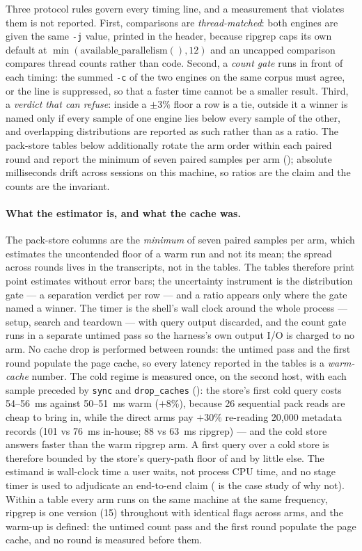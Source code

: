 \documentclass[11pt,letterpaper]{article}
\begin{document}
Three protocol rules govern every timing line, and a measurement that
violates them is not reported. First, comparisons are \emph{thread-matched}:
both engines are given the same \texttt{-j} value, printed in the header,
because ripgrep caps its own default at
$\min(\mathrm{available\_parallelism()},12)$ and an uncapped comparison
compares thread counts rather than code. Second, a \emph{count gate} runs in
front of each timing: the summed \texttt{-c} of the two engines on the same
corpus must agree, or the line is suppressed, so that a faster time cannot be
a smaller result. Third, a \emph{verdict that can refuse}: inside a $\pm3\%$
floor a row is a tie, outside it a winner is named only if every sample of
one engine lies below every sample of the other, and overlapping
distributions are reported as such rather than as a ratio. The pack-store
tables below additionally rotate the arm order within each paired round and
report the minimum of seven paired samples per arm
(); absolute milliseconds drift across sessions
on this machine, so ratios are the claim and the counts are the invariant.

\paragraph{What the estimator is, and what the cache was.}
The pack-store columns are the \emph{minimum} of seven paired samples per
arm, which estimates the uncontended floor of a warm run and not its mean;
the spread across rounds lives in the transcripts, not in the tables. The
tables therefore print point estimates without error bars; the uncertainty
instrument is the distribution gate --- a separation verdict per row --- and
a ratio appears only where the gate named a winner. The
timer is the shell's wall clock around the whole process --- setup, search
and teardown --- with query output discarded, and the count gate runs in a
separate untimed pass so the harness's own output I/O is charged to no arm.
No cache drop is performed between rounds: the untimed pass and the first
round populate the page cache, so every latency reported in the tables is a
\emph{warm-cache} number. The cold regime is measured once, on the second
host, with each sample preceded by \texttt{sync} and
\texttt{drop\_caches} (): the
store's first cold query costs 54--56~ms against 50--51~ms warm
($+8\%$), because 26 sequential pack reads are cheap to bring in, while
the direct arms pay $+30\%$ re-reading 20{,}000 metadata records (101 vs
76~ms in-house; 88 vs 63~ms ripgrep) --- and the cold store answers
faster than the warm ripgrep arm. A first query over a cold store is
therefore bounded by the store's query-path floor of  and by
little else. The estimand is wall-clock time a user waits, not process CPU time,
and no stage timer is used to adjudicate an end-to-end claim
( is the case study of why not). Within a table every arm
runs on the same machine at the same frequency, ripgrep is one version
(15) throughout with identical flags across arms, and the warm-up is
defined: the untimed count pass and the first round populate the page
cache, and no round is measured before them.
\end{document}
